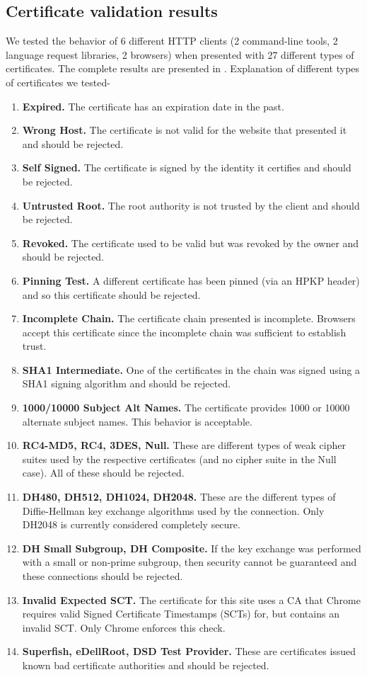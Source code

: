 \subsection{Certificate validation results}
We tested the behavior of 6 different HTTP clients (2 command-line tools, 2
language request libraries, 2 browsers) when presented with 27 different types
of certificates. The complete results are presented in .
Explanation of different types of certificates we tested-
\begin{enumerate}
  \item \textbf{Expired.} The certificate has an expiration date in the past.
  \item \textbf{Wrong Host.} The certificate is not valid for the website that
    presented it and should be rejected.
  \item \textbf{Self Signed.} The certificate is signed by the identity it
    certifies and should be rejected.
  \item \textbf{Untrusted Root.} The root authority is not trusted by the
    client and should be rejected.
  \item \textbf{Revoked.} The certificate used to be valid but was revoked by
    the owner and should be rejected.
  \item \textbf{Pinning Test.} A different certificate has been pinned (via an
    HPKP header) and so this certificate should be rejected.
  \item \textbf{Incomplete Chain.} The certificate chain presented is
    incomplete. Browsers accept this certificate since the incomplete chain was
    sufficient to establish trust.
  \item \textbf{SHA1 Intermediate.} One of the certificates in the chain was
    signed using a SHA1 signing algorithm and should be rejected.
  \item \textbf{1000/10000 Subject Alt Names.} The certificate provides 1000 or
    10000 alternate subject names. This behavior is acceptable.
  \item \textbf{RC4-MD5, RC4, 3DES, Null.} These are different types of weak
    cipher suites used by the respective certificates (and no cipher suite in
    the Null case). All of these should be rejected.
  \item \textbf{DH480, DH512, DH1024, DH2048.} These are the different types of
    Diffie-Hellman key exchange algorithms used by the connection. Only DH2048
    is currently considered completely secure.
  \item \textbf{DH Small Subgroup, DH Composite.} If the key exchange was
    performed with a small or non-prime subgroup, then security cannot be
    guaranteed and these connections should be rejected.
  \item \textbf{Invalid Expected SCT.} The certificate for this site uses a CA
    that Chrome requires valid Signed Certificate Timestamps (SCTs) for, but
    contains an invalid SCT. Only Chrome enforces this check.
  \item \textbf{Superfish, eDellRoot, DSD Test Provider.} These are certificates
    issued known bad certificate authorities and should be rejected.
\end{enumerate}

